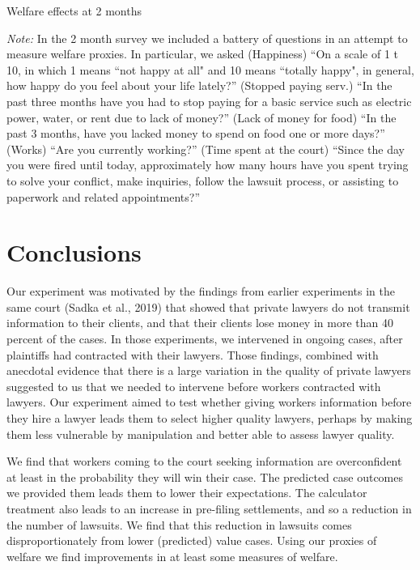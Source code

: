 \documentclass[12 pt]{article}
\newenvironment{figurenotes}[1][\footnotesize{Note}]{\begin{minipage}[t]{\linewidth}\footnotesize{\itshape#1: }}{\end{minipage}}
\begin{document}
\begin{table}[!ht]
    \caption{Welfare effects at 2 months} 
    \label{tab:11_welfare}
    \center
    \scriptsize{}
    \begin{figurenotes}
    In the 2 month survey we included a battery of questions in an attempt to measure welfare proxies. In particular, we asked (Happiness) “On a scale of 1 t 10, in which 1 means “not happy at all" and 10 means “totally happy", in general, how happy do you feel about your life lately?” (Stopped paying serv.) “In the past three months have you had to stop paying for a basic service such as electric power, water, or rent due to lack of money?” (Lack of money for food) “In the past 3 months, have you lacked money to spend on food one or more days?” (Works) “Are you currently working?” (Time spent at the court) “Since the day you were fired until today, approximately how many hours have you spent trying to solve your conflict, make inquiries, follow the lawsuit process, or assisting to paperwork and related appointments?”
    \end{figurenotes}
  
\end{table}

\section{Conclusions}
Our experiment was motivated by the findings from earlier experiments in the same court (Sadka et al., 2019) that showed that private lawyers do not transmit information to their clients, and that their clients lose money in more than 40 percent of the cases. In those experiments, we intervened in ongoing cases, after plaintiffs had contracted with their lawyers. Those findings, combined with anecdotal evidence that there is a large variation in the quality of private lawyers suggested to us that we needed to intervene before workers contracted with lawyers. Our experiment aimed to test whether giving workers information before they hire a lawyer leads them to select higher quality lawyers, perhaps by making them less vulnerable by manipulation and better able to assess lawyer quality.

We find that workers coming to the court seeking information are overconfident at least in the probability they will win their case. The predicted case outcomes we provided them leads them to lower their expectations. The calculator treatment also leads to an increase in pre-filing settlements, and so a reduction in the number of lawsuits. We find that this reduction in lawsuits comes disproportionately from lower (predicted) value cases. Using our proxies of welfare we find improvements in at least some measures of welfare.
\end{document}
